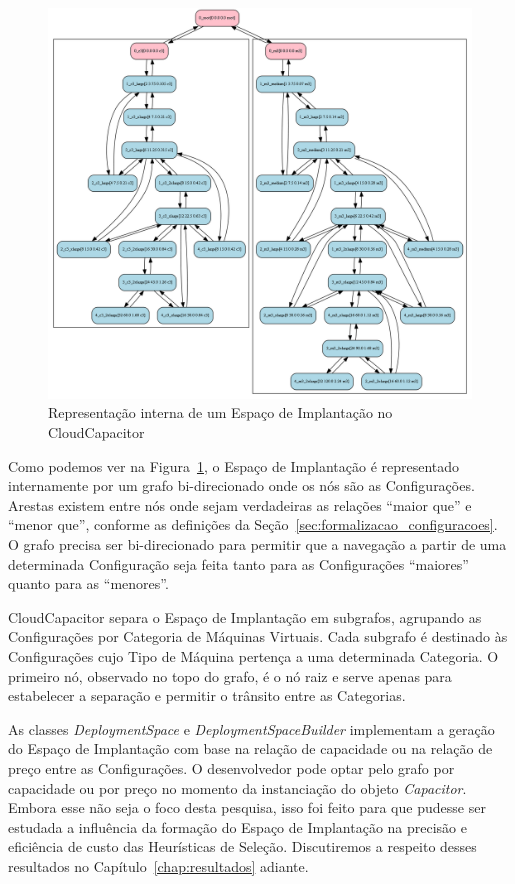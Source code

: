 \begin{figure}[htb]
  \caption{\label{fig:depspace_real}Representação interna de um Espaço de Implantação no CloudCapacitor}
  \begin{center}
    \includegraphics[scale=0.35]{img/exemplo_grafo_espaco_implantacao}
  \end{center}
\end{figure}

Como podemos ver na Figura~\ref{fig:depspace_real}, o Espaço de Implantação é 
representado internamente por um grafo bi-direcionado onde os nós são as 
Configurações. Arestas existem entre nós onde sejam verdadeiras as relações 
``maior que'' e ``menor que'', conforme as definições da 
Seção~\ref{sec:formalizacao_configuracoes}. O grafo precisa ser bi-direcionado 
para permitir que a navegação a partir de uma determinada Configuração seja feita 
tanto para as Configurações ``maiores'' quanto para as ``menores''.

CloudCapacitor separa o Espaço de Implantação em subgrafos, agrupando as
Configurações por Categoria de Máquinas Virtuais. Cada subgrafo é destinado às
Configurações cujo Tipo de Máquina pertença a uma determinada Categoria. O primeiro
nó, observado no topo do grafo, é o nó raiz e serve apenas para estabelecer a 
separação e permitir o trânsito entre as Categorias.

As classes \emph{DeploymentSpace} e \emph{DeploymentSpaceBuilder} implementam
a geração do Espaço de Implantação com base na relação de capacidade ou na relação
de preço entre as Configurações. O desenvolvedor pode optar pelo grafo por capacidade ou por preço no momento da
instanciação do objeto \emph{Capacitor}. Embora esse não seja o foco desta 
pesquisa, isso foi feito para que pudesse ser estudada a influência da formação 
do Espaço de Implantação na precisão e eficiência de custo das Heurísticas de 
Seleção. Discutiremos a respeito desses resultados no Capítulo~\ref{chap:resultados} 
adiante.

